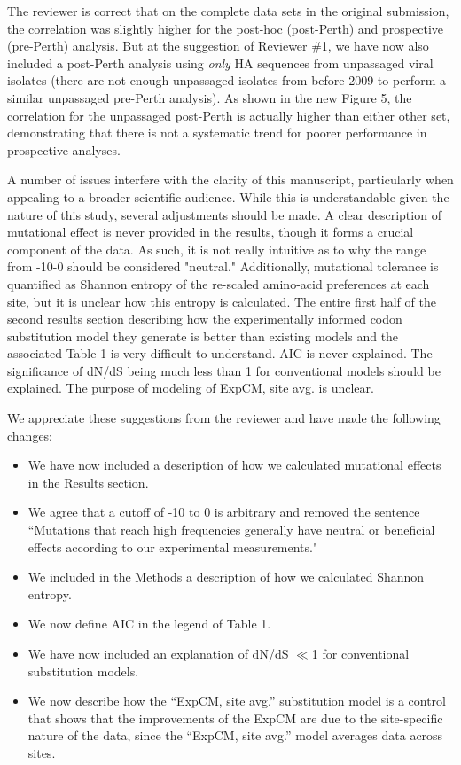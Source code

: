\documentclass[11pt, oneside]{article}   	%
\newcommand{\response}[1]{{\color{black}#1}}
\begin{document}
\response{
The reviewer is correct that on the complete data sets in the original submission, the correlation was slightly higher for the post-hoc (post-Perth) and prospective (pre-Perth) analysis.
But at the suggestion of Reviewer \#1, we have now also included a post-Perth analysis using \emph{only} HA sequences from unpassaged viral isolates (there are not enough unpassaged isolates from before 2009 to perform a similar unpassaged pre-Perth analysis).
As shown in the new Figure 5, the correlation for the unpassaged post-Perth is actually higher than either other set, demonstrating that there is not a systematic trend for poorer performance in prospective analyses.
}

A number of issues interfere with the clarity of this manuscript, particularly when appealing to a broader scientific audience. While this is understandable given the nature of this study, several adjustments should be made. A clear description of mutational effect is never provided in the results, though it forms a crucial component of the data. As such, it is not really intuitive as to why the range from -10-0 should be considered "neutral." Additionally, mutational tolerance is quantified as Shannon entropy of the re-scaled amino-acid preferences at each site, but it is unclear how this entropy is calculated. The entire first half of the second results section describing how the experimentally informed codon substitution model they generate is better than existing models and the associated Table 1 is very difficult to understand. AIC is never explained. The significance of dN/dS being much less than 1 for conventional models should be explained. The purpose of modeling of ExpCM, site avg. is unclear. 

\response{We appreciate these suggestions from the reviewer and have made the following changes:
\begin{itemize}
\item We have now included a description of how we calculated mutational effects in the Results section.
\item We agree that a cutoff of -10 to 0 is arbitrary and removed the sentence ``Mutations that reach high frequencies generally have neutral or beneficial effects according to our experimental measurements." 
\item We included in the Methods a description of how we calculated Shannon entropy.
\item We now define AIC in the legend of Table 1.
\item We have now included an explanation of dN/dS $\ll$1 for conventional substitution models.
\item We now describe how the ``ExpCM, site avg.'' substitution model is a control that shows that the improvements of the ExpCM are due to the site-specific nature of the data, since the ``ExpCM, site avg.'' model averages data across sites.
\end{itemize}
}
\end{document}
